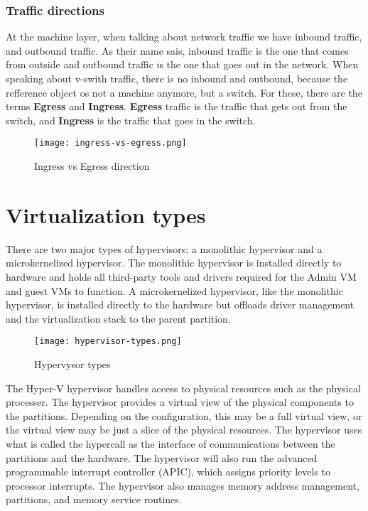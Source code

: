 \vspace{5mm}
\subsubsection{Traffic directions}
\vspace{5mm}

At the machine layer, when talking about network traffic we have inbound traffic, and outbound traffic. As their name sais, inbound traffic is the one that comes from
outside and outbound traffic is the one that goes out in the network. When speaking about v-swith traffic, there is no inbound and outbound, because the refference object os not 
a machine anymore, but a switch. For these, there are the terms \textbf{Egress} and \textbf{Ingress}. \textbf{Egress} traffic is the traffic that gets out from the switch,
and \textbf{Ingress} is the traffic that goes in the switch.
\vspace{5mm}

\begin{figure}[h]
\centering
\texttt{[image: ingress-vs-egress.png]}
\caption{Ingress vs Egress direction}
\label{ingress-vs-egress}
\end{figure}

\vspace{5mm}
\section{Virtualization types}
\vspace{5mm}
There are two major types of hypervisors: a monolithic hypervisor and a microkernelized hypervisor. The monolithic hypervisor is installed directly to hardware and holds
all third-party tools and drivers required for the Admin VM and guest VMs to function. A microkernelized hypervisor, like the monolithic hypervisor, is installed directly to the
hardware but offloads driver management and the virtualization stack to the parent partition. \cite{BOOK:3}
\vspace{5mm}

\begin{figure}[h]
\centering
\texttt{[image: hypervisor-types.png]}
\caption{Hypervysor types}
\label{hypervisor-types}
\end{figure}

\vspace{5mm}
The Hyper-V hypervisor handles access to physical resources such as the physical processer. The hypervisor provides a virtual view of the physical components to the
partitions. Depending on the configuration, this may be a full virtual view, or the virtual view may be just a slice of the physical resources. The hypervisor uses what is called the
hypercall as the interface of communications between the partitions and the hardware. The hypervisor will also run the advanced programmable interrupt controller (APIC),
which assigns priority levels to processor interrupts. The hypervisor also manages memory address management, partitions, and memory service routines.

